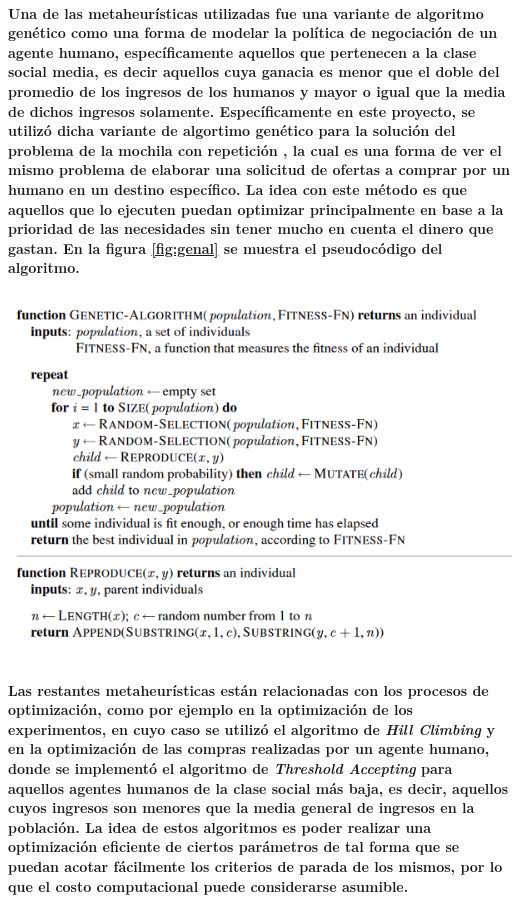\documentclass[12pt]{amsart}
\begin{document}
\paragraph{Una de las metaheurísticas utilizadas fue una variante de algoritmo genético como una forma de modelar la política de negociación de un agente humano, específicamente aquellos que pertenecen a la clase social media, es decir aquellos cuya ganacia es menor que el doble del promedio de los ingresos de los humanos y mayor o igual que la media de dichos ingresos solamente. Específicamente en este proyecto, se utilizó dicha variante de algortimo genético para la solución del problema de la mochila con repetición \cite{mochilarep}, la cual es una forma de ver el mismo problema de elaborar una solicitud de ofertas a comprar por un humano en un destino específico. La idea con este método es que aquellos que lo ejecuten puedan optimizar principalmente en base a la prioridad de las necesidades sin tener mucho en cuenta el dinero que gastan. En la figura \ref{fig:genal} se muestra el pseudocódigo del algoritmo.}

\begin{center}
	\includegraphics[scale=0.8]{./images/genal.png}
	\label{fig:genal}
\end{center}

\paragraph{Las restantes metaheurísticas están relacionadas con los procesos de optimización, como por ejemplo en la optimización de los experimentos, en cuyo caso se utilizó el algoritmo de \textit{Hill Climbing} \cite{hillclimb} y en la optimización de las compras realizadas por un agente humano, donde se implementó el algoritmo de \textit{Threshold Accepting} \cite{taccept} para aquellos agentes humanos de la clase social más baja, es decir, aquellos cuyos ingresos son menores que la media general de ingresos en la población. La idea de estos algoritmos es poder realizar una optimización eficiente de ciertos parámetros de tal forma que se puedan acotar fácilmente los criterios de parada de los mismos, por lo que el costo computacional puede considerarse asumible.} \label{par:hill}
\end{document}

